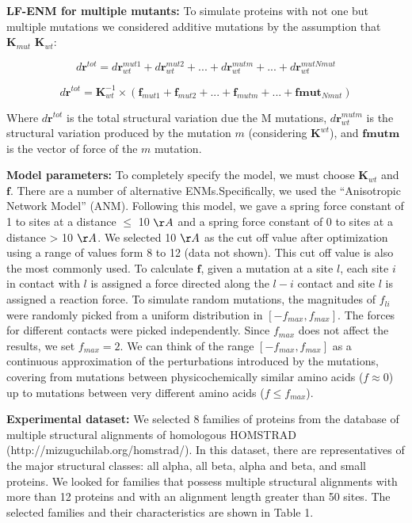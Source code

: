 \documentclass{article}
\begin{document}
{\bf LF-ENM for multiple mutants: }
To simulate proteins with not one but multiple mutations we considered additive mutations by the assumption that $\mathbf{K}_{mut}$ \cong $\mathbf{K}_{wt}$:

\begin{equation}
d\mathbf{r}^{tot} = d\mathbf{r}^{mut1}_{wt}+d\mathbf{r}^{mut2}_{wt}+ ...+d\mathbf{r}^{mutm}_{wt}+...+d\mathbf{r}^{mutNmut}_{wt}
\end{equation}

\begin{equation}
d\mathbf{r}^{tot} =\mathbf{K}^{-1}_{wt}\times(\mathbf{f}_{mut1}+\mathbf{f}_{mut2}+...+\mathbf{f}_{mutm}+...+\mathbf{fmut}_{Nmut}) 
\end{equation}

Where $d\mathbf{r}^{tot}$ is the total structural variation due the M mutations, $d\mathbf{r}^{mutm}_{wt}$ is the structural variation produced by the mutation $m$ (considering $\mathbf{K}^{wt}$), and $\mathbf{fmutm}$ is the vector of force of the $m$ mutation.

{\bf Model parameters: }
To completely specify the model, we must choose $\mathbf{K}_{wt}$ and $\mathbf{f}$. There are a number of alternative ENMs.Specifically, we used the ``Anisotropic Network Model'' (ANM). Following this model, we gave a spring force constant of 1 to sites at a distance $\leq$ 10 $\AA$ and a spring force constant of 0 to sites at a distance > 10 $\AA$. We selected 10 $\AA$ as the cut off value after optimization using a range of values form 8 to 12 (data not shown). This cut off value is also the most commonly used.
To calculate $\mathbf{f}$, given a mutation at a site $l$, each site $i$ in contact with $l$ is assigned a force directed along the $l-i$ contact and site $l$ is assigned a reaction force. To simulate random mutations, the magnitudes of $f_{li}$ were randomly picked from a uniform distribution in $[-f_{max},f_{max}]$. The forces for different contacts were picked independently. Since $f_{max}$ does not affect the results, we set
$f_{max} = 2$. We can think of the range $[-f_{max}, f_{max}]$ as a continuous approximation of the perturbations introduced by the mutations, covering
from mutations between physicochemically similar amino acids ($f \approx 0$) up to mutations between very different amino acids ($f \leq f_{max}$).

{\bf Experimental dataset:}
We selected 8 families of proteins from the database of multiple structural alignments of homologous HOMSTRAD (http://mizuguchilab.org/homstrad/). In this dataset, there are representatives of the major structural classes: all alpha, all beta, alpha and beta, and small proteins. We looked for families that possess multiple structural alignments with more than 12 proteins and with an alignment length greater than 50 sites. The selected families and their characteristics are shown in Table 1.
\end{document}

